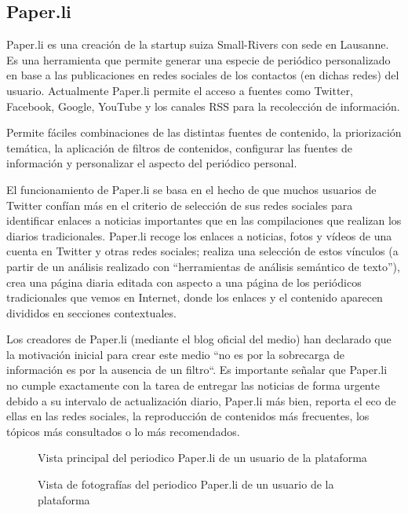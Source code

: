 \subsection{Paper.li}\label{subsec:paperli}

Paper.li \cite{paperli} es una creación de la startup suiza Small-Rivers con sede en Lausanne. Es una herramienta que permite generar una especie de periódico personalizado en base a las publicaciones en redes sociales de los contactos (en dichas redes) del usuario. Actualmente Paper.li permite el acceso a fuentes como Twitter, Facebook, Google, YouTube y los canales RSS para la recolección de información.

Permite fáciles combinaciones de las distintas fuentes de contenido, la priorización temática, la aplicación de filtros de contenidos, configurar las fuentes de información y personalizar el aspecto del periódico personal.

El funcionamiento de Paper.li se basa en el hecho de que muchos usuarios de Twitter confían más en el criterio de selección de sus redes sociales para identificar enlaces a noticias importantes que en las compilaciones que realizan los diarios tradicionales. Paper.li recoge los enlaces a noticias, fotos y vídeos de una cuenta en Twitter y otras redes sociales;  realiza una selección de estos vínculos (a partir de un análisis realizado con “herramientas de análisis semántico de texto”), crea una página diaria editada con aspecto a una página de los periódicos tradicionales que vemos en Internet, donde los enlaces y el contenido aparecen divididos en secciones contextuales.

Los creadores de Paper.li (mediante el blog oficial del medio) han declarado que la motivación inicial para crear este medio “no es por la sobrecarga de información es por la ausencia de un filtro“. Es importante señalar que Paper.li no cumple exactamente con la tarea de entregar las noticias de forma urgente debido a su intervalo de actualización diario, Paper.li más bien, reporta el eco de ellas en las redes sociales, la reproducción de contenidos más frecuentes, los tópicos más consultados o lo más recomendados.

\begin{figure}[H]
	\centering
	\begin{minipage}[t]{.45\textwidth}
		\begin{center}
			\caption{Vista principal del periodico Paper.li de un usuario de la plataforma}
			\label{fig:paperli1}
		\end{center}
	\end{minipage}
	\hfill
	\begin{minipage}[t]{.45\textwidth}
		\begin{center}
			\caption{Vista de fotografías del periodico Paper.li de un usuario de la plataforma}
			\label{fig:paperli2}
		\end{center}
	\end{minipage}
	\hfill
\end{figure}


